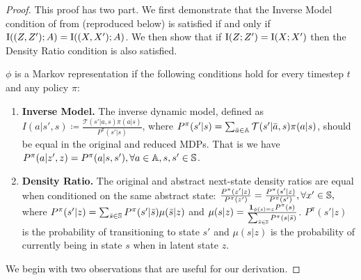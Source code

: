 \THmarkovmi*
\begin{proof}
This proof has two part. We first demonstrate that the Inverse Model condition of  from \citet{markov_z} (reproduced below) is satisfied if and only if $\text{I}((Z,Z');A)=\text{I}((X,X');A)$. We then show that if $\text{I}(Z;Z') =\text{I}(X;X')$ then the Density Ratio condition is also satisfied.
    \begin{theorem}\label{c2:th:markov_z}
    $\phi$ is a Markov representation if the following conditions hold for every timestep $t$ and any policy $\pi$:
    \begin{enumerate}
        \item \textbf{Inverse Model.} The inverse dynamic model, defined as $I(a|s',s)\coloneqq \frac{\mathcal{T}(s'|a,s)\pi(a|s)}{P^\pi(s'|s)}$, where $P^\pi(s'|s)=\sum_{\bar{a}\in{\mathbb{A}}} \mathcal{T}(s'|\bar{a},s)\pi(a|s)$, should be equal in the original and reduced MDPs. That is we have $P^\pi(a|z',z)=P^\pi(a|s,s'), \forall a\in{\mathbb{A}}, s,s'\in{\mathbb{S}}$.
        \item \textbf{Density Ratio.} The original and abstract next-state density ratios are equal when conditioned on the same abstract state: $\frac{P^\pi(z'|z)}{P^\pi(z')}=\frac{P^\pi(s'|z)}{P^\pi(s')}, \forall x' \in {\mathbb{S}},$ where $P^\pi(s'|z)=\sum_{\bar{s}\in{\mathbb{S}}} P^\pi(s'|\bar{s})\mu(\bar{s}|z)$ and $\mu(s|z) = \frac{\bm{1}_{\phi(s)=z} P^\pi(s)}{\sum_{\bar{s}\in{\mathbb{S}}} P^\pi(s|\bar{s})}$. $P^\pi(s'|z)$ is the probability of transitioning to state $s'$ and $\mu(s|z)$ is the probability of currently being in state $s$ when in latent state $z$.
    \end{enumerate}
\end{theorem}

We begin with two observations that are useful for our derivation.




\end{proof}
